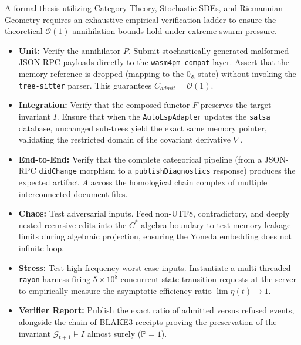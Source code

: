A formal thesis utilizing Category Theory, Stochastic SDEs, and Riemannian Geometry requires an exhaustive empirical verification ladder to ensure the theoretical $\mathcal{O}(1)$ annihilation bounds hold under extreme swarm pressure.

\begin{itemize}
    \item \textbf{Unit:} Verify the annihilator $P$. Submit stochastically generated malformed JSON-RPC payloads directly to the \texttt{wasm4pm-compat} layer. Assert that the memory reference is dropped (mapping to the $0_{\mathfrak{A}}$ state) without invoking the \texttt{tree-sitter} parser. This guarantees $C_{admit} = \mathcal{O}(1)$.
    
    \item \textbf{Integration:} Verify that the composed functor $F$ preserves the target invariant $I$. Ensure that when the \texttt{AutoLspAdapter} updates the \texttt{salsa} database, unchanged sub-trees yield the exact same memory pointer, validating the restricted domain of the covariant derivative $\nabla$.
    
    \item \textbf{End-to-End:} Verify that the complete categorical pipeline (from a JSON-RPC \texttt{didChange} morphism to a \texttt{publishDiagnostics} response) produces the expected artifact $A$ across the homological chain complex of multiple interconnected document files.
    
    \item \textbf{Chaos:} Test adversarial inputs. Feed non-UTF8, contradictory, and deeply nested recursive edits into the $C^*$-algebra boundary to test memory leakage limits during algebraic projection, ensuring the Yoneda embedding does not infinite-loop.
    
    \item \textbf{Stress:} Test high-frequency worst-case inputs. Instantiate a multi-threaded \texttt{rayon} harness firing $5 \times 10^8$ concurrent state transition requests at the server to empirically measure the asymptotic efficiency ratio $\lim \eta(t) \to 1$.
    
    \item \textbf{Verifier Report:} Publish the exact ratio of admitted versus refused events, alongside the chain of BLAKE3 receipts proving the preservation of the invariant $\mathcal{G}_{t+1} \models I$ almost surely ($\mathbb{P} = 1$).
\end{itemize}
